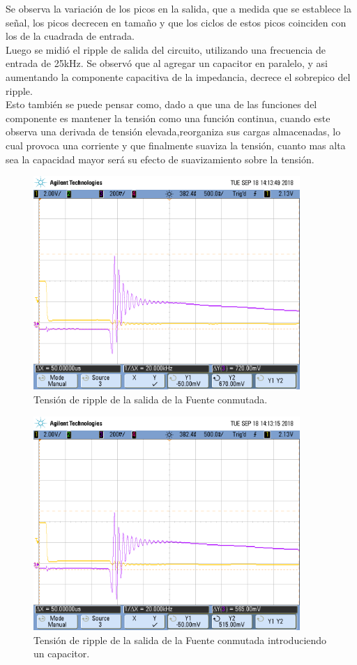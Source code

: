 Se observa la variación de los picos en la salida, que a medida que se establece la señal, los picos decrecen en tamaño y que los ciclos de estos picos coinciden con los de la cuadrada de entrada.\\
Luego se midió el ripple de salida del circuito, utilizando una frecuencia de entrada de 25kHz. Se observó que al agregar un capacitor en paralelo, y asi aumentando la componente capacitiva de la impedancia, decrece el sobrepico del ripple.\\Esto también se puede  pensar como, dado a que una de las funciones del componente es mantener la tensión como una función  continua, cuando  este observa una derivada de tensión elevada,reorganiza sus cargas almacenadas, lo cual provoca una corriente y que finalmente suaviza la tensión, cuanto mas alta sea la capacidad mayor será su efecto de suavizamiento sobre la tensión.
\begin{figure}[H]
	\centering
	\includegraphics[width=0.9\textwidth]{Imagenes/ripple_.png}
\caption{Tensión de ripple de la salida de la Fuente conmutada.}
	\label{fig:fconr}
\end{figure}
\begin{figure}[H]
	\centering
	\includegraphics[width=0.9\textwidth]{Imagenes/ripple_c.png}
\caption{Tensión de ripple de la salida de la Fuente conmutada introduciendo un capacitor.}
	\label{fig:fconrc}
\end{figure}

